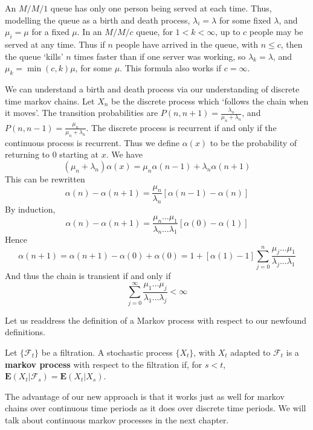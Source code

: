 An $M/M/1$ queue has only one person being served at each time. Thus, modelling the queue as a birth and death process, $\lambda_i = \lambda$ for some fixed $\lambda$, and $\mu_i = \mu$ for a fixed $\mu$. In an $M/M/c$ queue, for $1 < k < \infty$, up to $c$ people may be served at any time. Thus if $n$ people have arrived in the queue, with $n \leq c$, then the queue `kills' $n$ times faster than if one server was working, so $\lambda_k = \lambda$, and $\mu_k = \min(c,k) \mu$, for some $\mu$. This formula also works if $c = \infty$.

We can understand a birth and death process via our understanding of discrete time markov chains. Let $X_n$ be the discrete process which `follows the chain when it moves'. The transition probabilities are $P(n,n+1) = \frac{\lambda_n}{\mu_n + \lambda_n}$, and $P(n,n-1) = \frac{\mu_n}{\mu_n + \lambda_n}$. The discrete process is recurrent if and only if the continuous process is recurrent. Thus we define $\alpha(x)$ to be the probability of returning to 0 starting at $x$. We have
%
\[ (\mu_n + \lambda_n) \alpha(x) = \mu_n \alpha(n-1) + \lambda_n \alpha(n+1) \]
%
This can be rewritten
%
\[ \alpha(n) - \alpha(n+1) = \frac{\mu_n}{\lambda_n} [\alpha(n-1) - \alpha(n)] \]
%
By induction,
%
\[ \alpha(n) - \alpha(n+1) = \frac{\mu_n \dots \mu_1}{\lambda_n \dots \lambda_1} [\alpha(0) - \alpha(1)] \]
%
Hence
%
\[ \alpha(n+1) = \alpha(n+1) - \alpha(0) + \alpha(0) = 1 + [\alpha(1) - 1] \sum_{j = 0}^n \frac{\mu_j \dots \mu_1}{\lambda_j \dots \lambda_1} \]
%
And thus the chain is transient if and only if
%
\[ \sum_{j = 0}^\infty \frac{\mu_1 \dots \mu_j}{\lambda_1 \dots \lambda_j} < \infty \]




Let us readdress the definition of a Markov process with respect to our newfound definitions.

\begin{definition}
    Let $\{ \mathcal{F}_t \}$ be a filtration. A stochastic process $\{ X_t \}$, with $X_t$ adapted to $\mathcal{F}_t$ is a {\bf markov process} with respect to the filtration if, for $s < t$, $\mathbf{E}(X_t | \mathcal{F}_s) = \mathbf{E}(X_t | X_s)$.
\end{definition}

The advantage of our new approach is that it works just as well for markov chains over continuous time periods as it does over discrete time periods. We will talk about continuous markov processes in the next chapter.